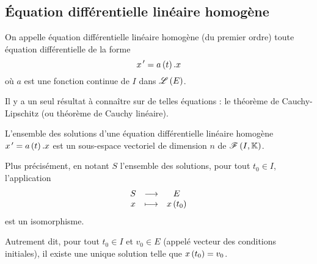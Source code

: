 \subsection{Équation différentielle linéaire homogène}

\begin{defi}
On appelle équation différentielle linéaire homogène (du premier ordre) toute équation différentielle de la forme \[x^{\,\prime}=a\left(t\right).x\] où \(a\) est une fonction continue de \(I\) dans \(\mathscr{L}\left(E\right)\).
\end{defi}

Il y a un seul résultat à connaître sur de telles équations : le théorème de Cauchy-Lipschitz (ou théorème de Cauchy linéaire).

\begin{theo}
L'ensemble des solutions d'une équation différentielle linéaire homogène \(x^{\,\prime}=a\left(t\right).x\) est un sous-espace vectoriel de dimension \(n\) de \(\mathscr{F}\left(I,\mathbb{K}\right)\).

Plus précisément, en notant \(S\) l'ensemble des solutions, pour tout \(t_0\in I\), l'application \[\begin{array}[t]{ccc}S & \longrightarrow & E \\ x & \longmapsto & x\left(t_0\right)\end{array}\] est un isomorphisme.

Autrement dit, pour tout \(t_0\in I\) et \(v_0\in E\) (appelé vecteur des conditions initiales), il existe une unique solution telle que \(x\left(t_0\right)=v_0\).
\end{theo}

